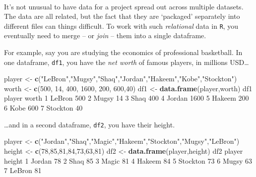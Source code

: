 \documentclass[
]{book}
\newenvironment{Shaded}{\begin{snugshade}}{\end{snugshade}}
\newcommand{\DecValTok}[1]{\textcolor[rgb]{0.00,0.00,0.81}{#1}}
\newcommand{\KeywordTok}[1]{\textcolor[rgb]{0.13,0.29,0.53}{\textbf{#1}}}
\newcommand{\NormalTok}[1]{#1}
\newcommand{\StringTok}[1]{\textcolor[rgb]{0.31,0.60,0.02}{#1}}
\begin{document}
~

It's not unusual to have data for a project spread out across multiple datasets. The data are all related, but the fact that they are `packaged' separately into different files can things difficult. To work with such \emph{relational} data in \texttt{R}, you eventually need to merge -- or \emph{join} -- them into a single dataframe.

For example, say you are studying the economics of professional basketball. In one dataframe, \texttt{df1}, you have the \emph{net worth} of famous players, in millions USD\ldots{}

\begin{Shaded}
\begin{Highlighting}[]
\NormalTok{player <-}\StringTok{ }\KeywordTok{c}\NormalTok{(}\StringTok{"LeBron"}\NormalTok{,}\StringTok{"Mugsy"}\NormalTok{,}\StringTok{"Shaq"}\NormalTok{,}\StringTok{"Jordan"}\NormalTok{,}\StringTok{"Hakeem"}\NormalTok{,}\StringTok{"Kobe"}\NormalTok{,}\StringTok{"Stockton"}\NormalTok{)}
\NormalTok{worth <-}\StringTok{ }\KeywordTok{c}\NormalTok{(}\DecValTok{500}\NormalTok{, }\DecValTok{14}\NormalTok{, }\DecValTok{400}\NormalTok{, }\DecValTok{1600}\NormalTok{, }\DecValTok{200}\NormalTok{, }\DecValTok{600}\NormalTok{,}\DecValTok{40}\NormalTok{)}
\NormalTok{df1 <-}\StringTok{ }\KeywordTok{data.frame}\NormalTok{(player,worth)}
\NormalTok{df1}
\NormalTok{    player worth}
\DecValTok{1}\NormalTok{   LeBron   }\DecValTok{500}
\DecValTok{2}\NormalTok{    Mugsy    }\DecValTok{14}
\DecValTok{3}\NormalTok{     Shaq   }\DecValTok{400}
\DecValTok{4}\NormalTok{   Jordan  }\DecValTok{1600}
\DecValTok{5}\NormalTok{   Hakeem   }\DecValTok{200}
\DecValTok{6}\NormalTok{     Kobe   }\DecValTok{600}
\DecValTok{7}\NormalTok{ Stockton    }\DecValTok{40}
\end{Highlighting}
\end{Shaded}

\ldots and in a second dataframe, \texttt{df2}, you have their height.

\begin{Shaded}
\begin{Highlighting}[]
\NormalTok{player <-}\StringTok{ }\KeywordTok{c}\NormalTok{(}\StringTok{"Jordan"}\NormalTok{,}\StringTok{"Shaq"}\NormalTok{,}\StringTok{"Magic"}\NormalTok{,}\StringTok{"Hakeem"}\NormalTok{,}\StringTok{"Stockton"}\NormalTok{,}\StringTok{"Mugsy"}\NormalTok{,}\StringTok{"LeBron"}\NormalTok{)}
\NormalTok{height <-}\StringTok{ }\KeywordTok{c}\NormalTok{(}\DecValTok{78}\NormalTok{,}\DecValTok{85}\NormalTok{,}\DecValTok{81}\NormalTok{,}\DecValTok{84}\NormalTok{,}\DecValTok{73}\NormalTok{,}\DecValTok{63}\NormalTok{,}\DecValTok{81}\NormalTok{)}
\NormalTok{df2 <-}\StringTok{ }\KeywordTok{data.frame}\NormalTok{(player,height)}
\NormalTok{df2}
\NormalTok{    player height}
\DecValTok{1}\NormalTok{   Jordan     }\DecValTok{78}
\DecValTok{2}\NormalTok{     Shaq     }\DecValTok{85}
\DecValTok{3}\NormalTok{    Magic     }\DecValTok{81}
\DecValTok{4}\NormalTok{   Hakeem     }\DecValTok{84}
\DecValTok{5}\NormalTok{ Stockton     }\DecValTok{73}
\DecValTok{6}\NormalTok{    Mugsy     }\DecValTok{63}
\DecValTok{7}\NormalTok{   LeBron     }\DecValTok{81}
\end{Highlighting}
\end{Shaded}
\end{document}
